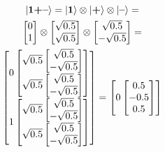 \begin{figure}[H]
    \centering
    \begin{gather*}
        \ket{\mathbf{1}\textbf{+}\textbf{--}} = \ket{\mathbf{1}}\otimes\ket{\textbf{+}}\otimes\ket{\textbf{--}} = \\
        \begin{bmatrix} 0\\ 1\\ \end{bmatrix}\otimes\begin{bmatrix} \sqrt{0.5}\\ \sqrt{0.5}\\ \end{bmatrix}\otimes\begin{bmatrix} \sqrt{0.5}\\ -\sqrt{0.5}\\ \end{bmatrix} = \\
        \begin{bmatrix}
            0
            \begin{bmatrix}
                \sqrt{0.5}
                \begin{bmatrix}
                    \sqrt{0.5}\\
                    -\sqrt{0.5}\\
                \end{bmatrix}\\
                \sqrt{0.5}
                \begin{bmatrix}
                    \sqrt{0.5}\\
                    -\sqrt{0.5}\\
                \end{bmatrix}\\
            \end{bmatrix}\\
            1
            \begin{bmatrix}
                \sqrt{0.5}
                \begin{bmatrix}
                    \sqrt{0.5}\\
                    -\sqrt{0.5}\\
                \end{bmatrix}\\
                \sqrt{0.5}
                \begin{bmatrix}
                    \sqrt{0.5}\\
                    -\sqrt{0.5}\\
                \end{bmatrix}\\
            \end{bmatrix}\\
        \end{bmatrix}= 
        \begin{bmatrix}
            0
            \begin{bmatrix}
                0.5\\
                -0.5\\
                0.5\\

\end{bmatrix}
\end{bmatrix}
\end{gather*}
\end{figure}
